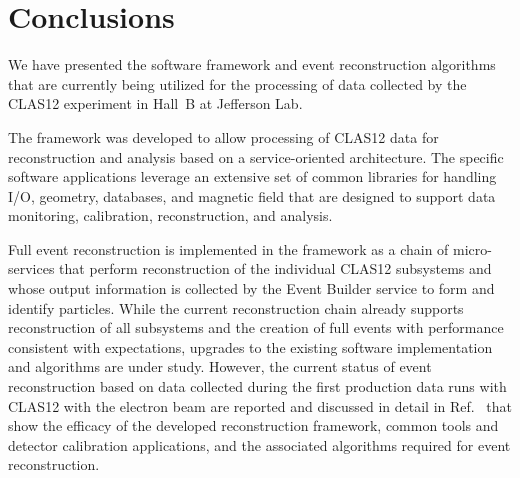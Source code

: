 \section{Conclusions}

We have presented the software framework and event reconstruction algorithms that are currently being utilized
for the processing of data collected by the CLAS12 experiment in Hall~B at Jefferson Lab.  

The framework was developed to allow processing of CLAS12 data for reconstruction and analysis based on a
service-oriented architecture. The specific software applications leverage an extensive set of common libraries
for handling I/O, geometry, databases, and magnetic field that are designed to support data monitoring, calibration,
reconstruction, and analysis.

Full event reconstruction is implemented in the framework as a chain of micro-services that perform reconstruction
of the individual CLAS12 subsystems and whose output information is collected by the Event Builder service to form
and identify particles. While the current reconstruction chain already supports reconstruction of all subsystems
and the creation of full events with performance consistent with expectations, upgrades to the existing software
implementation and algorithms are under study. However, the current status of event reconstruction based on
data collected during the first production data runs with CLAS12 with the electron beam are reported and
discussed in detail in Ref.~\cite{clas12-nim} that show the efficacy of the developed reconstruction framework,
common tools and detector calibration applications, and the associated algorithms required for event reconstruction.
